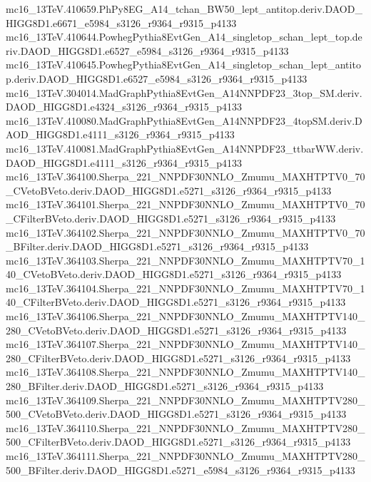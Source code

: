 mc16_13TeV.410659.PhPy8EG_A14_tchan_BW50_lept_antitop.deriv.DAOD_HIGG8D1.e6671_e5984_s3126_r9364_r9315_p4133 \\
mc16_13TeV.410644.PowhegPythia8EvtGen_A14_singletop_schan_lept_top.deriv.DAOD_HIGG8D1.e6527_e5984_s3126_r9364_r9315_p4133 \\
mc16_13TeV.410645.PowhegPythia8EvtGen_A14_singletop_schan_lept_antitop.deriv.DAOD_HIGG8D1.e6527_e5984_s3126_r9364_r9315_p4133 \\
mc16_13TeV.304014.MadGraphPythia8EvtGen_A14NNPDF23_3top_SM.deriv.DAOD_HIGG8D1.e4324_s3126_r9364_r9315_p4133 \\
mc16_13TeV.410080.MadGraphPythia8EvtGen_A14NNPDF23_4topSM.deriv.DAOD_HIGG8D1.e4111_s3126_r9364_r9315_p4133 \\
mc16_13TeV.410081.MadGraphPythia8EvtGen_A14NNPDF23_ttbarWW.deriv.DAOD_HIGG8D1.e4111_s3126_r9364_r9315_p4133 \\
mc16_13TeV.364100.Sherpa_221_NNPDF30NNLO_Zmumu_MAXHTPTV0_70_CVetoBVeto.deriv.DAOD_HIGG8D1.e5271_s3126_r9364_r9315_p4133 \\
mc16_13TeV.364101.Sherpa_221_NNPDF30NNLO_Zmumu_MAXHTPTV0_70_CFilterBVeto.deriv.DAOD_HIGG8D1.e5271_s3126_r9364_r9315_p4133 \\
mc16_13TeV.364102.Sherpa_221_NNPDF30NNLO_Zmumu_MAXHTPTV0_70_BFilter.deriv.DAOD_HIGG8D1.e5271_s3126_r9364_r9315_p4133 \\
mc16_13TeV.364103.Sherpa_221_NNPDF30NNLO_Zmumu_MAXHTPTV70_140_CVetoBVeto.deriv.DAOD_HIGG8D1.e5271_s3126_r9364_r9315_p4133 \\
mc16_13TeV.364104.Sherpa_221_NNPDF30NNLO_Zmumu_MAXHTPTV70_140_CFilterBVeto.deriv.DAOD_HIGG8D1.e5271_s3126_r9364_r9315_p4133 \\
mc16_13TeV.364106.Sherpa_221_NNPDF30NNLO_Zmumu_MAXHTPTV140_280_CVetoBVeto.deriv.DAOD_HIGG8D1.e5271_s3126_r9364_r9315_p4133 \\
mc16_13TeV.364107.Sherpa_221_NNPDF30NNLO_Zmumu_MAXHTPTV140_280_CFilterBVeto.deriv.DAOD_HIGG8D1.e5271_s3126_r9364_r9315_p4133 \\
mc16_13TeV.364108.Sherpa_221_NNPDF30NNLO_Zmumu_MAXHTPTV140_280_BFilter.deriv.DAOD_HIGG8D1.e5271_s3126_r9364_r9315_p4133 \\
mc16_13TeV.364109.Sherpa_221_NNPDF30NNLO_Zmumu_MAXHTPTV280_500_CVetoBVeto.deriv.DAOD_HIGG8D1.e5271_s3126_r9364_r9315_p4133 \\
mc16_13TeV.364110.Sherpa_221_NNPDF30NNLO_Zmumu_MAXHTPTV280_500_CFilterBVeto.deriv.DAOD_HIGG8D1.e5271_s3126_r9364_r9315_p4133 \\
mc16_13TeV.364111.Sherpa_221_NNPDF30NNLO_Zmumu_MAXHTPTV280_500_BFilter.deriv.DAOD_HIGG8D1.e5271_e5984_s3126_r9364_r9315_p4133 \\
